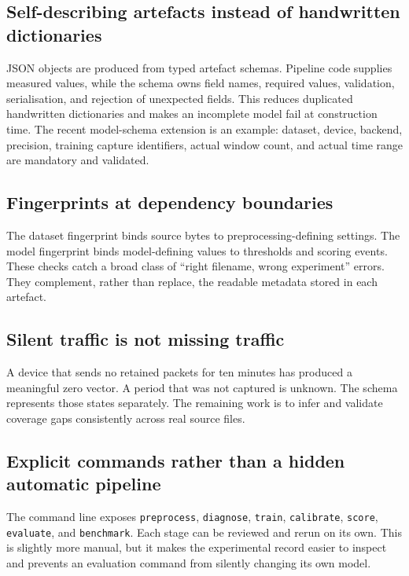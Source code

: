 \documentclass[11pt,a4paper]{article}
\begin{document}
\subsection{Self-describing artefacts instead of handwritten dictionaries}

JSON objects are produced from typed artefact schemas. Pipeline code supplies measured values, while the schema owns field names, required values, validation, serialisation, and rejection of unexpected fields. This reduces duplicated handwritten dictionaries and makes an incomplete model fail at construction time. The recent model-schema extension is an example: dataset, device, backend, precision, training capture identifiers, actual window count, and actual time range are mandatory and validated.

\subsection{Fingerprints at dependency boundaries}

The dataset fingerprint binds source bytes to preprocessing-defining settings. The model fingerprint binds model-defining values to thresholds and scoring events. These checks catch a broad class of ``right filename, wrong experiment'' errors. They complement, rather than replace, the readable metadata stored in each artefact.

\subsection{Silent traffic is not missing traffic}

A device that sends no retained packets for ten minutes has produced a meaningful zero vector. A period that was not captured is unknown. The schema represents those states separately. The remaining work is to infer and validate coverage gaps consistently across real source files.

\subsection{Explicit commands rather than a hidden automatic pipeline}

The command line exposes \texttt{preprocess}, \texttt{diagnose}, \texttt{train}, \texttt{calibrate}, \texttt{score}, \texttt{evaluate}, and \texttt{benchmark}. Each stage can be reviewed and rerun on its own. This is slightly more manual, but it makes the experimental record easier to inspect and prevents an evaluation command from silently changing its own model.
\end{document}
